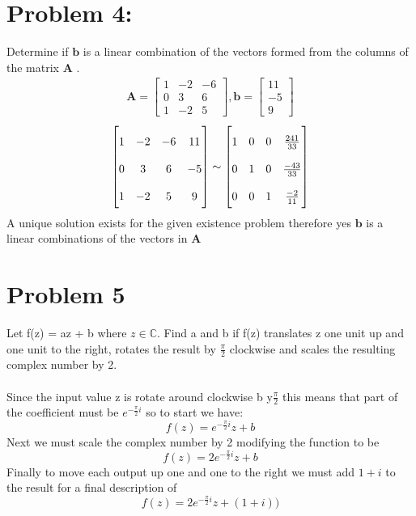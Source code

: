 \documentclass[12pt,a4paper]{article}
\begin{document}
\section{Problem 4: }
Determine if $\textbf{b}$ is a linear combination of the vectors formed from the columns of the matrix $\textbf{A}$ .
\begin{align*}
  \textbf{A}=
    \begin{bmatrix}
   1 & -2 & -6  \\
   0 & 3 & 6  \\
   1 & -2 & 5
   \end{bmatrix},
   \textbf{b}=\begin{bmatrix}
  11  \\
  -5   \\
  9
  \end{bmatrix}
\end{align*}
\begin{align*}
  \begin{bmatrix}
 1 & -2 & -6 & 11\\
 0 & 3 & 6 & -5\\
 1 & -2 & 5& 9
 \end{bmatrix} \sim
   \renewcommand\arraystretch{2}
 \begin{bmatrix}
1 & 0 & 0 & \frac{241}{33}\\
0 & 1 & 0 & \frac{-43}{33}\\
0 & 0 & 1 & \frac{-2}{11}
\end{bmatrix}
\end{align*}
A unique solution exists for the given existence problem therefore yes $\textbf{b}$ is a linear combinations of the vectors in \textbf{A}
\section{Problem 5}
Let f(z) = az + b where $z \in \mathbb{C}$. Find a and b if f(z) translates z one unit up and one
unit to the right, rotates the result by $\frac{\pi}{2}$
clockwise and scales the resulting complex number
by 2.\\\\
Since the input value z is rotate around clockwise b y$\frac{\pi}{2}$ this means that part of the coefficient must be $e^{-\frac{\pi}{2}i}$ so to start we have:
\[
  f(z)=e^{-\frac{\pi}{2}i}z+b
\]
Next we must scale the complex number by 2 modifying the function to be
\[
  f(z)=2e^{-\frac{\pi}{2}i}z+b
\]
Finally to move each output up one and one to the right we must add $1+i$ to the result for a final description of
\[
  f(z)=2e^{-\frac{\pi}{2}i}z+(1+i))
\]
\end{document}
